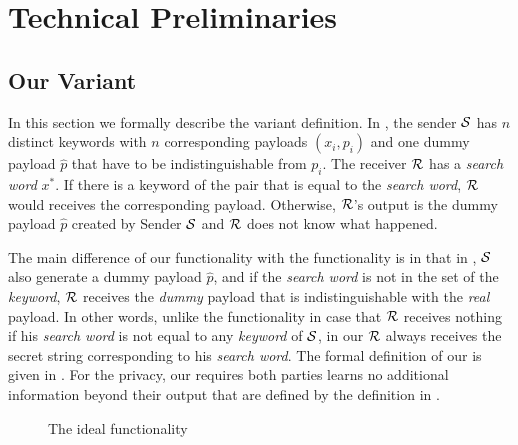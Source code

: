 \section{Technical Preliminaries}
\label{sect:prelims}

\subsection{Our \SSOT Variant}
\label{sec:ssotfunc}

In this section we formally describe the variant \SSOT definition. In \SSOT, the sender $\mathcal{S}$  has $n$ distinct keywords with $n$ corresponding payloads $(x_i, p_i)$ and one dummy payload $\hat{p}$ that have to be indistinguishable from $p_i$. The receiver $\mathcal{R}$ has a \textit{search word} $x^*$. If there is a keyword of the pair that is equal to the \textit{search word}, $\mathcal{R}$  would receives the corresponding payload. Otherwise, $\mathcal{R}$'s output is the dummy payload $\hat{p}$ created by Sender $\mathcal{S}$ and $\mathcal{R}$ does not know what happened.

The main difference of our \SSOT functionality with the \KS\cite{TCC:FIPR05} functionality is in that in \SSOT, $\mathcal{S}$ also generate a dummy payload $\hat{p}$, and if the \textit{search word} is not in the set of the \textit{keyword}, $\mathcal{R}$ receives the \textit{dummy} payload that is indistinguishable with the \textit{real} payload. In other words, unlike the \KS functionality\cite{TCC:FIPR05} in case that $\mathcal{R}$ receives nothing if his \textit{search word} is not equal to any \textit{keyword} of $\mathcal{S}$, in our \SSOT  $\mathcal{R}$ always receives the secret string corresponding to his \textit{search word}.  The formal definition of our \SSOT is given in  
. For the privacy, our \SSOT requires both parties learns no additional information beyond their output that are defined by the definition in . 


\begin{figure}[htb]\centering
{}
\caption{The \SSOT ideal functionality}
\label{fig:1ssotfunc}
\end{figure} 

